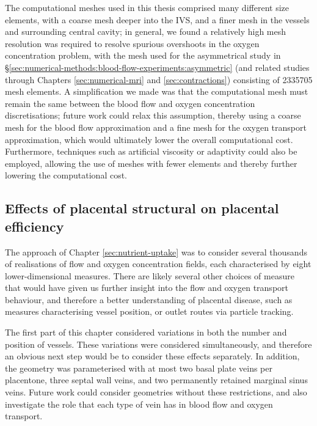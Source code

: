             The computational meshes used in this thesis comprised many different size elements, with a coarse mesh deeper into the IVS, and a finer mesh in the vessels and surrounding central cavity; in general, we found a relatively high mesh resolution was required to resolve spurious overshoots in the oxygen concentration problem, with the mesh used for the asymmetrical study in \S\ref{sec:numerical-methods:blood-flow-experiments:asymmetric} (and related studies through Chapters \ref{sec:numerical-mri} and \ref{sec:contractions}) consisting of \num{2335705} mesh elements. A simplification we made was that the computational mesh must remain the same between the blood flow and oxygen concentration discretisations; future work could relax this assumption, thereby using a coarse mesh for the blood flow approximation and a fine mesh for the oxygen transport approximation, which would ultimately lower the overall computational cost. Furthermore, techniques such as artificial viscosity or adaptivity could also be employed, allowing the use of meshes with fewer elements and thereby further lowering the computational cost.

        \subsection{Effects of placental structural on placental efficiency}
            The approach of Chapter \ref{sec:nutrient-uptake} was to consider several thousands of realisations of flow and oxygen concentration fields, each characterised by eight lower-dimensional measures. There are likely several other choices of measure that would have given us further insight into the flow and oxygen transport behaviour, and therefore a better understanding of placental disease, such as measures characterising vessel position, or outlet routes via particle tracking.

            The first part of this chapter considered variations in both the number and position of vessels. These variations were considered simultaneously, and therefore an obvious next step would be to consider these effects separately. In addition, the geometry was parameterised with at most two basal plate veins per placentone, three septal wall veins, and two permanently retained marginal sinus veins. Future work could consider geometries without these restrictions, and also investigate the role that each type of vein has in blood flow and oxygen transport.

